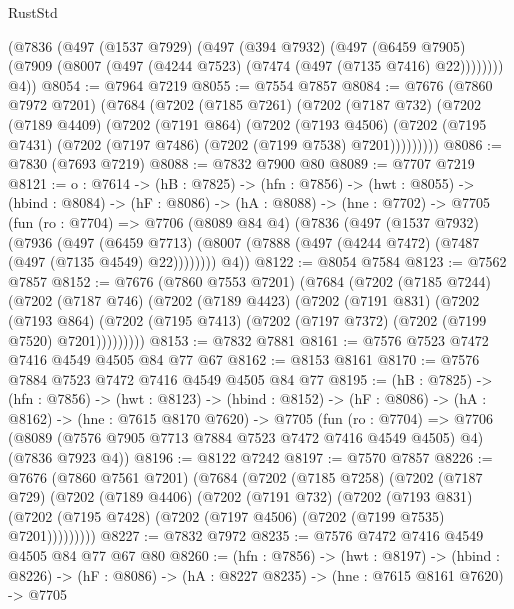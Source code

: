\begin{lexlean}{RustStd}
\begin{coremodule}
{\begin{coremodule}
{{{{{{{{{{{{      (@7836
        (@497
          (@1537 @7929)
          (@497
            (@394 @7932)
            (@497
              (@6459 @7905)
              (@7909 (@8007 (@497 (@4244 @7523) (@7474 (@497 (@7135 @7416) @22))))))))
        @4))
@8054 := @7964 @7219
@8055 := @7554 @7857
@8084 := @7676
    (@7860 @7972 @7201)
    (@7684
      (@7202
        (@7185 @7261)
        (@7202
          (@7187 @732)
          (@7202
            (@7189 @4409)
            (@7202
              (@7191 @864)
              (@7202
                (@7193 @4506)
                (@7202 (@7195 @7431) (@7202 (@7197 @7486) (@7202 (@7199 @7538) @7201)))))))))
@8086 := @7830 (@7693 @7219)
@8088 := @7832 @7900 @80
@8089 := @7707 @7219
@8121 := {o : @7614} ->
  (hB : @7825) ->
  (hfn : @7856) ->
  (hwt : @8055) ->
  (hbind : @8084) ->
  (hF : @8086) ->
  (hA : @8088) ->
  (hne : @7702) ->
  @7705
    (fun (ro : @7704) =>
    @7706
      (@8089 @84 @4)
      (@7836
        (@497
          (@1537 @7932)
          (@7936
            (@497
              (@6459 @7713)
              (@8007 (@7888 (@497 (@4244 @7472) (@7487 (@497 (@7135 @4549) @22))))))))
        @4))
@8122 := @8054 @7584
@8123 := @7562 @7857
@8152 := @7676
    (@7860 @7553 @7201)
    (@7684
      (@7202
        (@7185 @7244)
        (@7202
          (@7187 @746)
          (@7202
            (@7189 @4423)
            (@7202
              (@7191 @831)
              (@7202
                (@7193 @864)
                (@7202 (@7195 @7413) (@7202 (@7197 @7372) (@7202 (@7199 @7520) @7201)))))))))
@8153 := @7832 @7881
@8161 := @7576 @7523 @7472 @7416 @4549 @4505 @84 @77 @67
@8162 := @8153 @8161
@8170 := @7576 @7884 @7523 @7472 @7416 @4549 @4505 @84 @77
@8195 := (hB : @7825) ->
  (hfn : @7856) ->
  (hwt : @8123) ->
  (hbind : @8152) ->
  (hF : @8086) ->
  (hA : @8162) ->
  (hne : @7615 @8170 @7620) ->
  @7705
    (fun (ro : @7704) =>
    @7706 (@8089 (@7576 @7905 @7713 @7884 @7523 @7472 @7416 @4549 @4505) @4) (@7836 @7923 @4))
@8196 := @8122 @7242
@8197 := @7570 @7857
@8226 := @7676
    (@7860 @7561 @7201)
    (@7684
      (@7202
        (@7185 @7258)
        (@7202
          (@7187 @729)
          (@7202
            (@7189 @4406)
            (@7202
              (@7191 @732)
              (@7202
                (@7193 @831)
                (@7202 (@7195 @7428) (@7202 (@7197 @4506) (@7202 (@7199 @7535) @7201)))))))))
@8227 := @7832 @7972
@8235 := @7576 @7472 @7416 @4549 @4505 @84 @77 @67 @80
@8260 := (hfn : @7856) ->
  (hwt : @8197) ->
  (hbind : @8226) ->
  (hF : @8086) ->
  (hA : @8227 @8235) ->
  (hne : @7615 @8161 @7620) ->
  @7705
}}}}}}}}}}}}
\end{coremodule}}
\end{coremodule}
\end{lexlean}

